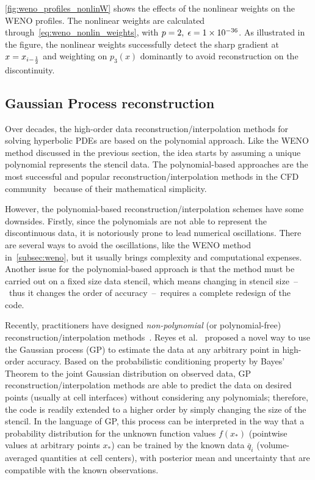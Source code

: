 \cref{fig:weno_profiles_nonlinW} shows the effects of the nonlinear weights on the WENO profiles.
The nonlinear weights are calculated through~\cref{eq:weno_nonlin_weights}, with \( p = 2, \; \epsilon = \num{1.E-36} \).
As illustrated in the figure, the nonlinear weights successfully detect the sharp gradient at \( x = x_{{i-\frac{1}{2}}} \)
and weighting on \( p_{3} (x) \) dominantly to avoid reconstruction on the discontinuity.



\subsection{Gaussian Process reconstruction}\label{subsec:gp}

Over decades, the high-order data reconstruction/interpolation methods
for solving hyperbolic PDEs are based on the polynomial approach.
Like the WENO method discussed in the previous section,
the idea starts by assuming a unique polynomial represents the stencil data.
The polynomial-based approaches are the most successful and popular reconstruction/interpolation methods
in the CFD community~\cite{van1979towards,colella1984piecewise,jiang1996efficient,lee2017piecewise}
because of their mathematical simplicity. 

However, the polynomial-based reconstruction/interpolation schemes have some downsides.
Firstly, since the polynomials are not able to represent the discontinuous data,
it is notoriously prone to lead numerical oscillations.
There are several ways to avoid the oscillations, like the WENO method in~\ref{subsec:weno},
but it usually brings complexity and computational expenses.
Another issue for the polynomial-based approach is that the method must be carried out
on a fixed size data stencil, which means changing in stencil size~--~thus it changes the order
of accuracy~--~requires a complete redesign of the code.

Recently, practitioners have designed \textit{non-polynomial} (or polynomial-free)
reconstruction/interpolation methods~\cite{moroney2006finite,moroney2007three,guo2017rbf,bigoni2017adaptive}.
Reyes et al.~\cite{reyes2018new,reyes2019variable} proposed a novel way to use the Gaussian process (GP)
to estimate the data at any arbitrary point in high-order accuracy.
Based on the probabilistic conditioning property by Bayes' Theorem to the joint Gaussian distribution on observed data,
GP reconstruction/interpolation methods are able to predict the data
on desired points (usually at cell interfaces) without considering any polynomials;
therefore, the code is readily extended to a higher order by simply changing the size of the stencil.
In the language of GP, this process can be interpreted in the way that
a probability distribution for the unknown function values \( f(x_{*})\) (pointwise values at arbitrary points \( x_{*} \))
can be trained by the known data \( \overline{q}_{i} \) (volume-averaged quantities at cell centers),
with posterior mean and uncertainty that are compatible with the known observations.

